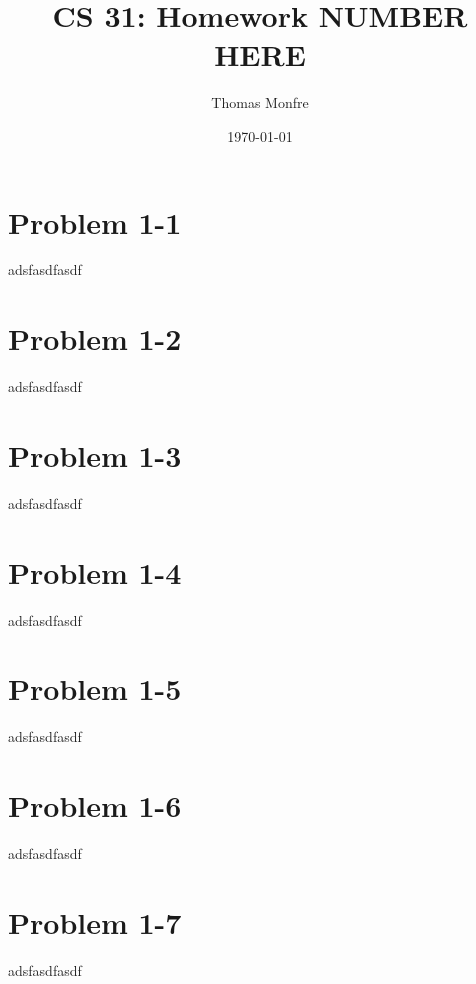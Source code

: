 \documentclass[11pt]{article}
\title{CS 31: Homework NUMBER HERE}
\author{Thomas Monfre}
\date{\today}
\begin{document}
\maketitle

\section{Problem 1-1}
adsfasdfasdf

\newpage

\section{Problem 1-2}
adsfasdfasdf

\newpage

\section{Problem 1-3}
adsfasdfasdf

\newpage

\section{Problem 1-4}
adsfasdfasdf

\newpage

\section{Problem 1-5}
adsfasdfasdf

\newpage

\section{Problem 1-6}
adsfasdfasdf

 \newpage

 \section{Problem 1-7}
adsfasdfasdf
\end{document}
